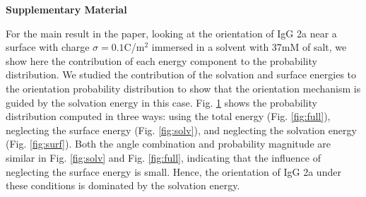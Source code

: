\documentclass[aip,notitlepage,reprint]{revtex4-1}
\begin{document}
\begin{center}
\textbf{Supplementary Material}
\end{center}
For the main result in the paper, looking at the orientation of IgG 2a near a surface with charge $\sigma=0.1$C/m$^2$ immersed in a solvent with 37mM of salt, we show here the contribution of each energy component to the probability distribution.
We studied the contribution of the solvation and surface energies to the orientation probability distribution to show that the orientation mechanism is guided by the solvation energy in this case.
Fig. \ref{fig:supp} shows the probability distribution computed in three ways: using the total energy (Fig. \ref{fig:full}), neglecting the surface energy (Fig. \ref{fig:solv}), and neglecting the solvation energy (Fig. \ref{fig:surf}). 
Both the angle combination and probability magnitude are similar in Fig. \ref{fig:solv} and Fig. \ref{fig:full}, indicating that the influence of neglecting the surface energy is small.
Hence, the orientation of IgG 2a under these conditions is dominated by the solvation energy.


\begin{figure} 
   \centering
   \\
   \\
   \caption{}
   \label{fig:supp}
\end{figure}

\clearpage
\end{document}
